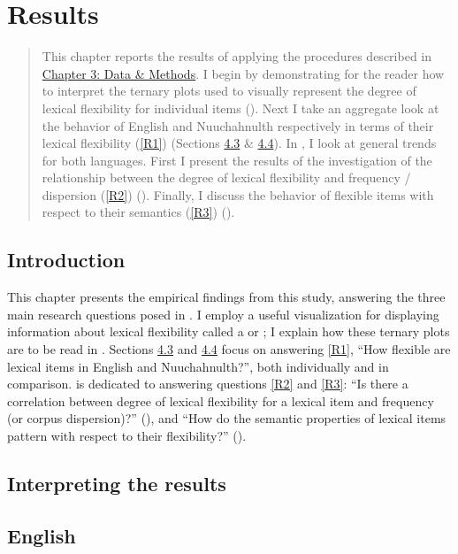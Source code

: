 \chapter{Results}
\label{ch:results}

\blockquote{This chapter reports the results of applying the procedures described in \hyperref[ch:methods]{Chapter 3: Data \& Methods}. I begin by demonstrating for the reader how to interpret the ternary plots used to visually represent the degree of lexical flexibility for individual items (). Next I take an aggregate look at the behavior of English and Nuuchahnulth respectively in terms of their lexical flexibility (\ref{R1}) (Sections \hyperref[sec:4.3]{4.3} \& \hyperref[sec:4.4]{4.4}). In , I look at general trends for both languages. First I present the results of the investigation of the relationship between the degree of lexical flexibility and frequency / dispersion (\ref{R2}) (). Finally, I discuss the behavior of flexible items with respect to their semantics (\ref{R3}) ().}

\section{Introduction}
\label{sec:4.1}

This chapter presents the empirical findings from this study, answering the three main research questions posed in . I employ a useful visualization for displaying information about lexical flexibility called a  or ; I explain how these ternary plots are to be read in . Sections \hyperref[sec:4.3]{4.3} and \hyperref[sec:4.4]{4.4} focus on answering \ref{R1}, \enquote{How flexible are lexical items in English and Nuuchahnulth?}, both individually and in comparison.  is dedicated to answering questions \ref{R2} and \ref{R3}: \enquote{Is there a correlation between degree of lexical flexibility for a lexical item and frequency (or corpus dispersion)?} (), and \enquote{How do the semantic properties of lexical items pattern with respect to their flexibility?} ().

\section{Interpreting the results}
\label{sec:4.2}

\section{English}
\label{sec:4.3}

